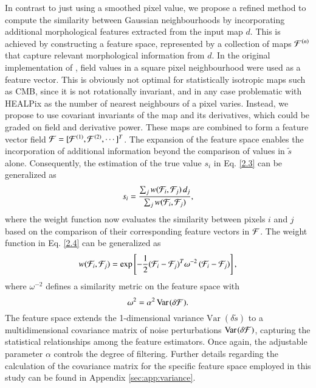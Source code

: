 \documentclass{aa}
\newcommand{\var}[1]{{\textrm{Var}\;\!(#1)}}
\begin{document}
In contrast to just using a smoothed pixel value, we propose a refined method to compute the similarity between Gaussian neighbourhoods by incorporating additional morphological features extracted from the input map $d$. This is achieved by constructing a feature space, represented by a collection of maps ${{\cal F}^{(n)}}$ that capture relevant morphological information from $d$. In the original implementation of \cite{Buades:2005}, field values in a square pixel neighbourhood were used as a feature vector. This is obviously not optimal for statistically isotropic maps such as CMB, since it is not rotationally invariant, and in any case problematic with HEALPix as the number of nearest neighbours of a pixel varies. Instead, we propose to use covariant invariants of the map and its derivatives, which could be graded on field and derivative power. These maps are combined to form a feature vector field ${\cal F}=[{\cal F}^{(1)},{\cal F}^{(2)},\cdots]^{T}$. The expansion of the feature space enables the incorporation of additional information beyond the comparison of values in $\tilde{s}$ alone. Consequently, the estimation of the true value $s_i$ in Eq. \eqref{2.3} can be generalized as
%
\begin{equation} \label{eq:nlmean}
  s_i = \frac{\sum_j w({\cal F}_i,{\cal F}_j)\, d_j}{\sum_j w({\cal F}_i,{\cal F}_j)} ,
\end{equation}
%
where the weight function now evaluates the similarity between pixels $i$ and $j$ based on the comparison of their corresponding feature vectors in ${\cal F}$. The weight function in Eq. \eqref{2.4} can be generalized as
%
\begin{equation}\label{eq:weight}
  w({\cal F}_i,{\cal F}_j) = \exp\left[-\frac{1}{2} ({\cal F}_i-{\cal F}_j)^T \omega^{-2} \, ({\cal F}_i-{\cal F}_j)\right] ,
\end{equation}
%
where $\omega^{-2}$ defines a similarity metric on the feature space with
%
\begin{equation}
   \omega^{2} = \alpha^{2}\, \var{\delta{\cal F}} .
\end{equation}
%
The feature space extends the 1-dimensional variance $\var{\delta\tilde{s}}$ to a multidimensional covariance matrix of noise perturbations $\var{\delta\cal F}$, capturing the statistical relationships among the feature estimators. Once again, the adjustable parameter $\alpha$ controls the degree of filtering. Further details regarding the calculation of the covariance matrix for the specific feature space employed in this study can be found in Appendix \ref{sec:app:variance}.
\end{document}
